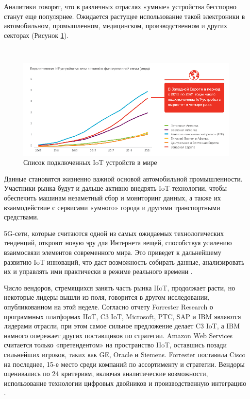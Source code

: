 Аналитики говорят, что в различных отраслях «умные» устройства бесспорно станут еще популярнее. Ожидается растущее использование такой электроники в автомобильном, промышленном, медицинском, производственном и других секторах (Рисунок \ref{fig:analysis:forecast:deviceDiagram}).

~
\begin{figure}[H]
\centering
	\includegraphics[scale=0.8]{figures/forrester.png}
	\caption{Список подключенных IoT устройств в мире}
	\label{fig:analysis:forecast:deviceDiagram}
\end{figure}

Данные становятся жизненно важной основой автомобильной промышленности. Участники рынка будут и дальше активно внедрять IoT-технологии, чтобы обеспечить машинам незаметный сбор и мониторинг данных, а также их взаимодействие с сервисами «умного» города и другими транспортными средствами.

5G-сети, которые считаются одной из самых ожидаемых технологических тенденций, откроют новую эру для Интернета вещей, способствуя усилению взаимосвязи элементов современного мира. Это приведет к дальнейшему развитию IoT-инноваций, что даст возможность собирать данные, анализировать их и управлять ими практически в режиме реального времени \cite{iot_data_2019}.

Число вендоров, стремящихся занять часть рынка IIoT, продолжает расти, но некоторые лидеры вышли из поля, говорится в другом исследовании, опубликованном на этой неделе. Согласно отчету Forrester Research о программных платформах IIoT, C3 IoT, Microsoft, PTC, SAP и IBM являются лидерами отрасли, при этом самое сильное предложение делает C3 IoT, а IBM намного опережает других поставщиков по стратегии. Amazon Web Services считается только «претендентом» на пространство IIoT, оставшись позади сильнейших игроков, таких как GE, Oracle и Siemens. Forrester поставила Cisco на последнее, 15-е место среди компаний по ассортименту и стратегии. Вендоры оценивались по 24 критериям, включая аналитические возможности, использование технологии цифровых двойников и производственную интеграцию \cite{iot_data_2019}.

